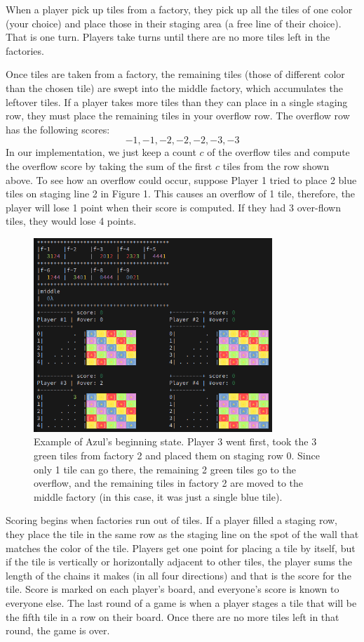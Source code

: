 \documentclass[12pt]{article}
\begin{document}
When a player pick up tiles from a factory, they pick up all the tiles of one color (your choice) and place those in their staging area (a free line of their choice). 
That is one turn. Players take turns until there are no more tiles left in the factories.

Once tiles are taken from a factory, the remaining tiles (those of different color than the chosen tile) are swept
into the middle factory, which accumulates the leftover tiles.
If a player takes more tiles than they can place in a single staging row, they must place the remaining
tiles in your overflow row. The overflow row has the following scores:
$$-1, -1, -2, -2, -2, -3, -3$$
In our implementation, we just keep a count $c$ of the overflow tiles and compute the overflow score by taking the
sum of the first $c$ tiles from the row shown above.
To see how an overflow could occur, suppose Player 1 tried to place 2 blue tiles on staging line 2 in Figure 1.
This causes an overflow of 1 tile, therefore, the player will lose 1 point when their score is computed.
If they had 3 over-flown tiles, they would lose 4 points. 

\begin{figure}
    \begin{center}
        \includegraphics[width=90mm]{images/i2.png}
        \caption{Example of Azul's beginning state. Player 3 went first, took the 3 green tiles from factory 2 and placed them
                 on staging row 0. Since only 1 tile can go there, the remaining 2 green tiles go to the overflow, and
                 the remaining tiles in factory 2 are moved to the middle factory (in this case, it was just a single blue tile).}
        \label{i2}
    \end{center}
\end{figure}


Scoring begins when factories run out of tiles. If a player filled a staging row, 
they place the tile in the same row as the staging line on the spot of the wall that matches the color of the tile. 
Players get one point for placing a tile by itself, but if the tile is vertically or horizontally adjacent to
other tiles, the player sums the length of the chains it makes (in all four directions) and that is the score for the tile.
Score is marked on each player's board, and everyone's score is known to everyone else.
The last round of a game is when a player stages a tile that will be the fifth tile
in a row on their board. Once there are no more tiles left in that round, the game is over.
\end{document}
